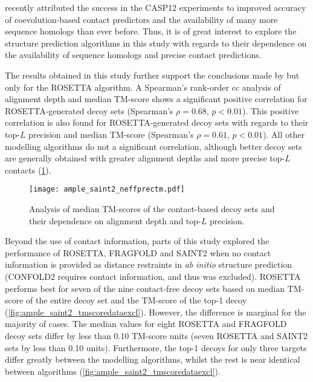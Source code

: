 \textcite{Abriata2018-lu} recently attributed the success in the CASP12 experiments to improved accuracy of coevolution-based contact predictors and the availability of many more sequence homologs than ever before. Thus, it is of great interest to explore the structure prediction algorithms in this study with regards to their dependence on the availability of sequence homologs and precise contact predictions.

The results obtained in this study further support the conclusions made by \textcite{Abriata2018-lu} but only for the ROSETTA algorithm. A Spearman's rank-order \gls{cc} analysis of alignment depth and median TM-score shows a significant positive correlation for ROSETTA-generated decoy sets (Spearman's $\rho=0.68$, $p<0.01$). This positive correlation is also found for ROSETTA-generated decoy sets with regards to their top-$L$ precision and median TM-score (Spearman's $\rho=0.61$, $p<0.01$). All other modelling algorithms do not a significant correlation, although better decoy sets are generally obtained with greater alignment depths and more precise top-$L$ contacts (\cref{fig:ample_saint2_neffprectm}).

\begin{figure}[H]
    \centering
    \texttt{[image: ample\_saint2\_neffprectm.pdf]}
    \caption[Analysis of alignment depth, precision and TM-scores]{Analysis of median TM-scores of the contact-based decoy sets and their dependence on  alignment depth and top-$L$ precision.}
    \label{fig:ample_saint2_neffprectm}
\end{figure}

Beyond the use of contact information, parts of this study explored the performance of ROSETTA, FRAGFOLD and SAINT2 when no contact information is provided as distance restraints in \textit{ab initio} structure prediction (CONFOLD2 requires contact information, and thus was excluded). ROSETTA performs best for seven of the nine contact-free decoy sets based on median TM-score of the entire decoy set and the TM-score of the top-1 decoy (\cref{fig:ample_saint2_tmscoredataexcl}). However, the difference is marginal for the majority of cases. The median values for eight ROSETTA and FRAGFOLD decoy sets differ by less than 0.10 TM-score units (seven ROSETTA and SAINT2 sets by less than 0.10 units). Furthermore, the top-1 decoys for only three targets differ greatly between the modelling algorithms, whilst the rest is near identical between algorithms (\cref{fig:ample_saint2_tmscoredataexcl}). 

